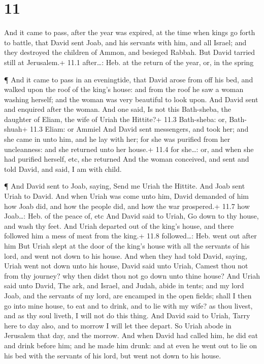 \hypertarget{section-10}{%
\section{11}\label{section-10}}

 And it came to pass, after the year was expired, at the
time when kings go forth to battle, that David sent Joab, and his
servants with him, and all Israel; and they destroyed the children of
Ammon, and besieged Rabbah. But David tarried still at Jerusalem.+ 11.1
after\ldots: Heb. at the return of the year, or, in the spring

 ¶ And it came to pass in an eveningtide, that David arose
from off his bed, and walked upon the roof of the king's house: and from
the roof he saw a woman washing herself; and the woman was very
beautiful to look upon.  And David sent and enquired after
the woman. And one said, Is not this Bath-sheba, the daughter of Eliam,
the wife of Uriah the Hittite?+ 11.3 Bath-sheba: or, Bath-shuah+ 11.3
Eliam: or Ammiel  And David sent messengers, and took her;
and she came in unto him, and he lay with her; for she was purified from
her uncleanness: and she returned unto her house.+ 11.4 for she\ldots:
or, and when she had purified herself, etc, she returned 
And the woman conceived, and sent and told David, and said, I am with
child.

 ¶ And David sent to Joab, saying, Send me Uriah the
Hittite. And Joab sent Uriah to David.  And when Uriah was
come unto him, David demanded of him how Joab did, and how the people
did, and how the war prospered.+ 11.7 how Joab\ldots: Heb. of the peace
of, etc  And David said to Uriah, Go down to thy house, and
wash thy feet. And Uriah departed out of the king's house, and there
followed him a mess of meat from the king.+ 11.8 followed\ldots: Heb.
went out after him  But Uriah slept at the door of the
king's house with all the servants of his lord, and went not down to his
house.  And when they had told David, saying, Uriah went
not down unto his house, David said unto Uriah, Camest thou not from thy
journey? why then didst thou not go down unto thine house? 
And Uriah said unto David, The ark, and Israel, and Judah, abide in
tents; and my lord Joab, and the servants of my lord, are encamped in
the open fields; shall I then go into mine house, to eat and to drink,
and to lie with my wife? as thou livest, and as thy soul liveth, I will
not do this thing.  And David said to Uriah, Tarry here to
day also, and to morrow I will let thee depart. So Uriah abode in
Jerusalem that day, and the morrow.  And when David had
called him, he did eat and drink before him; and he made him drunk: and
at even he went out to lie on his bed with the servants of his lord, but
went not down to his house.

